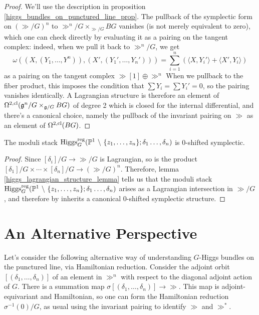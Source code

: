 \documentclass[10pt, oneside, a4paper]{article}
\begin{document}
\begin{proof} 
We'll use the description in proposition \ref{higgs_bundles_on_punctured_line_prop}.  The pullback of the symplectic form on $\left(\gg/G\right)^n$ to $\gg^n/G \times_{\gg/G} BG$ vanishes (is not merely equivalent to zero), which one can check directly by evaluating it as a pairing on the tangent complex: indeed, when we pull it back to $\gg^n/G$, we get
\[\omega((X, (Y_1, \ldots, Y^n)), (X', (Y_1', \ldots, Y_n'))) = \sum_{i=1}^n \left( \langle X, Y_i' \rangle + \langle X', Y_i \rangle \right)\]
as a pairing on the tangent complex $\gg[1] \oplus \gg^n$  When we pullback to the fiber product, this imposes the condition that $\sum Y_i = \sum Y_i' = 0$, so the pairing vanishes identically.  A Lagrangian structure is therefore an element of $\Omega^{2, \mathrm{cl}}(\mathfrak{g}^n/G \times_{\mathfrak{g}/G} BG)$ of degree 2 which is closed for the internal differential, and there's a canonical choice, namely the pullback of the invariant pairing on $\gg$ as an element of $\Omega^{2, \mathrm{cl}}(BG)$. 
\end{proof}

\begin{corollary} \label{residue_moduli_symplectic_cor}
The moduli stack $\operatorname{Higgs}_G^{\mathrm{reg}}(\mathbb{P}^1 \ \backslash \  \{z_1, \ldots, z_n\}; \delta_1 \ldots, \delta_n)$ is 0-shifted symplectic.
\end{corollary}

\begin{proof}
Since $[\delta_i]/G \to \gg/G$ is Lagrangian, so is the product $[\delta_1]/G \times \cdots \times [\delta_n]/G \to \left(\gg/G\right)^n$.  Therefore, lemma \ref{higgs_lagrangian_structure_lemma} tells us that the moduli stack $\operatorname{Higgs}_G^{\mathrm{reg}}(\mathbb{P}^1 \ \backslash \  \{z_1, \ldots, z_n\}; \delta_1 \ldots, \delta_n)$ arises as a Lagrangian intersection in $\gg/G$, and therefore by \cite[Theorem 2.9]{PTVV} inherits a canonical 0-shifted symplectic structure.
\end{proof}

\section{An Alternative Perspective}
Let's consider the following alternative way of understanding $G$-Higgs bundles on the punctured line, via Hamiltonian reduction.  Consider the adjoint orbit $[(\delta_1, \ldots, \delta_n)]$ of an element in $\gg^n$ with respect to the diagonal adjoint action of $G$. There is a summation map $\sigma [(\delta_1, \ldots, \delta_n)] \to \gg$.  This map is adjoint-equivariant and Hamiltonian, so one can form the Hamiltonian reduction $\sigma^{-1}(0)/G$, as usual using the invariant pairing to identify $\gg$ and $\gg^*$.
\end{document}
